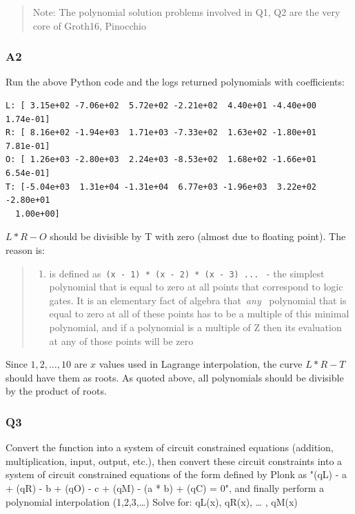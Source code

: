 \documentclass[11pt]{article}
\begin{document}
\begin{quote}
Note: The polynomial solution problems involved in Q1, Q2 are the very core of Groth16, Pinocchio
\end{quote}

\subsubsection{A2}
\label{a2}
Run the above Python code and the logs returned polynomials with coefficients:

\begin{verbatim}
L: [ 3.15e+02 -7.06e+02  5.72e+02 -2.21e+02  4.40e+01 -4.40e+00  1.74e-01]
R: [ 8.16e+02 -1.94e+03  1.71e+03 -7.33e+02  1.63e+02 -1.80e+01  7.81e-01]
O: [ 1.26e+03 -2.80e+03  2.24e+03 -8.53e+02  1.68e+02 -1.66e+01  6.54e-01]
T: [-5.04e+03  1.31e+04 -1.31e+04  6.77e+03 -1.96e+03  3.22e+02 -2.80e+01
  1.00e+00]
\end{verbatim}

\(L*R-O\) should be divisible by T with zero (almost due to floating point). The reason is:

\begin{quote}


\begin{enumerate}
\item is defined as \texttt{(x - 1) * (x - 2) * (x - 3) ...}  - the simplest polynomial that is equal to zero at all points that correspond to logic gates. It is an elementary fact of algebra that \emph{any}  polynomial that is equal to zero at all of these points has to be a multiple of this minimal polynomial, and if a polynomial is a multiple of Z then its evaluation at any of those points will be zero
\end{enumerate}
\end{quote}

Since \(1,2,\dots,10\) are \(x\) values used in Lagrange interpolation, the curve \(L*R-T\) should have them as roots. As quoted above, all polynomials should be divisible by the product of roots.

\subsubsection{Q3}
\label{q3}
Convert the function into a system of circuit constrained equations (addition, multiplication, input, output, etc.), then convert these circuit constraints into a system of circuit constrained equations of the form defined by Plonk as "(qL) - a + (qR) - b + (qO) - c + (qM) - (a * b) + (qC) = 0", and finally perform a polynomial interpolation (1,2,3,\ldots{}) Solve for: qL(x), qR(x), \ldots{} , qM(x)
\end{document}
